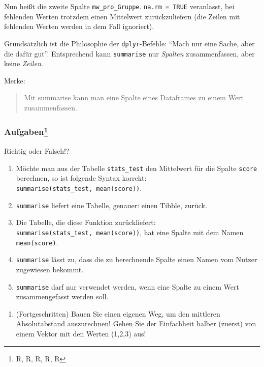 \documentclass[12pt,ngerman,]{book}
\providecommand{\tightlist}{%
  \setlength{\itemsep}{0pt}\setlength{\parskip}{0pt}}
\let\rmarkdownfootnote\footnote%
\def\footnote{\protect\rmarkdownfootnote}
\theoremstyle{definition}
\theoremstyle{definition}
\theoremstyle{remark}
\let\BeginKnitrBlock\begin \let\EndKnitrBlock\end
\begin{document}
Nun heißt die zweite Spalte \texttt{mw\_pro\_Gruppe}.
\texttt{na.rm\ =\ TRUE} veranlasst, bei fehlenden Werten trotzdem einen
Mittelwert zurückzuliefern (die Zeilen mit fehlenden Werten werden in
dem Fall ignoriert).

Grundsätzlich ist die Philosophie der \texttt{dplyr}-Befehle: ``Mach nur
eine Sache, aber die dafür gut''. Entsprechend kann \texttt{summarise}
nur \emph{Spalten} zusammenfassen, aber keine \emph{Zeilen}.

Merke:

\begin{quote}
Mit summarise kann man eine Spalte eines Dataframes zu einem Wert
zusammenfassen.
\end{quote}

\subsubsection[Aufgaben]{\texorpdfstring{Aufgaben\footnote{R, R, R, R, R}}{Aufgaben}}\label{aufgaben-6}

\BeginKnitrBlock{rmdexercises}
Richtig oder Falsch!?

\begin{enumerate}
\def\labelenumi{\arabic{enumi}.}
\tightlist
\item
  Möchte man aus der Tabelle \texttt{stats\_test} den Mittelwert für die
  Spalte \texttt{score} berechnen, so ist folgende Syntax korrekt:
  \texttt{summarise(stats\_test,\ mean(score))}.
\item
  \texttt{summarise} liefert eine Tabelle, genauer: einen Tibble,
  zurück.
\item
  Die Tabelle, die diese Funktion zurückliefert:
  \texttt{summarise(stats\_test,\ mean(score))}, hat eine Spalte mit dem
  Namen \texttt{mean(score)}.
\item
  \texttt{summarise} lässt zu, dass die zu berechnende Spalte einen
  Namen vom Nutzer zugewiesen bekommt.
\item
  \texttt{summarise} darf nur verwendet werden, wenn eine Spalte zu
  einem Wert zusammengefasst werden soll.
\end{enumerate}
\EndKnitrBlock{rmdexercises}

\begin{enumerate}
\def\labelenumi{\arabic{enumi}.}
\tightlist
\item
  (Fortgeschritten) Bauen Sie einen eigenen Weg, um den mittleren
  Absolutabstand auszurechnen! Gehen Sie der Einfachheit halber (zuerst)
  von einem Vektor mit den Werten (1,2,3) aus!
\end{enumerate}
\end{document}
